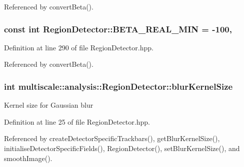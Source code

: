 Referenced by convert\-Beta().

\hypertarget{classmultiscale_1_1analysis_1_1RegionDetector_a87d07b8a993b50bcf050e4c206ac126c}{
\subsubsection[{B\-E\-T\-A\-\_\-\-R\-E\-A\-L\-\_\-\-M\-I\-N}]{\setlength{\rightskip}{0pt plus 5cm}const int Region\-Detector\-::\-B\-E\-T\-A\-\_\-\-R\-E\-A\-L\-\_\-\-M\-I\-N = -\/100\hspace{0.3cm}{\ttfamily [static]}, {\ttfamily [private]}}}\label{classmultiscale_1_1analysis_1_1RegionDetector_a87d07b8a993b50bcf050e4c206ac126c}


Definition at line 290 of file Region\-Detector.\-hpp.



Referenced by convert\-Beta().

\hypertarget{classmultiscale_1_1analysis_1_1RegionDetector_aae6ee0ec7f0a610dd8a906c1eb181bc7}{
\subsubsection[{blur\-Kernel\-Size}]{\setlength{\rightskip}{0pt plus 5cm}int multiscale\-::analysis\-::\-Region\-Detector\-::blur\-Kernel\-Size\hspace{0.3cm}{\ttfamily [private]}}}\label{classmultiscale_1_1analysis_1_1RegionDetector_aae6ee0ec7f0a610dd8a906c1eb181bc7}
Kernel size for Gaussian blur 

Definition at line 25 of file Region\-Detector.\-hpp.



Referenced by create\-Detector\-Specific\-Trackbars(), get\-Blur\-Kernel\-Size(), initialise\-Detector\-Specific\-Fields(), Region\-Detector(), set\-Blur\-Kernel\-Size(), and smooth\-Image().

